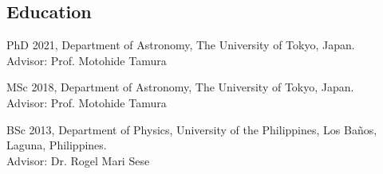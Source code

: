 \documentclass[11pt,letterpaper]{article}
\begin{document}
\subsection{Education}
\begin{list}{}{\cvlist}
\item
        PhD 2021, Department of Astronomy, The University of Tokyo, Japan.\\Advisor: Prof. Motohide Tamura
\item
        MSc 2018, Department of Astronomy, The University of Tokyo, Japan.\\Advisor: Prof. Motohide Tamura
\item
        BSc 2013, Department of Physics, University of the Philippines, Los Ba\~nos, Laguna, Philippines.\\Advisor: Dr. Rogel Mari Sese      
\end{list}
\end{document}
